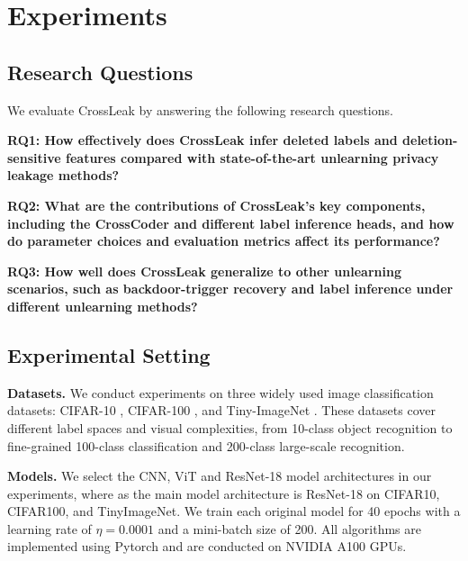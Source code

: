  



\section{Experiments} \label{exp}


\subsection{Research Questions}
\label{sec:exp_rqs}

We evaluate CrossLeak by answering the following research questions.

\textbf{RQ1: How effectively does CrossLeak infer deleted labels and deletion-sensitive features compared with state-of-the-art unlearning privacy leakage methods?}

\textbf{RQ2: What are the contributions of CrossLeak's key components, including the CrossCoder and different label inference heads, and how do parameter choices and evaluation metrics affect its performance?}

\textbf{RQ3: How well does CrossLeak generalize to other unlearning scenarios, such as backdoor-trigger recovery and label inference under different unlearning methods?}





\subsection{Experimental Setting}



\noindent
\textbf{Datasets.}
We conduct experiments on three widely used image classification datasets: CIFAR-10 \citep{krizhevsky2009learning}, CIFAR-100 \citep{krizhevsky2009learning}, and Tiny-ImageNet \citep{le2015tiny}. These datasets cover different label spaces and visual complexities, from 10-class object recognition to fine-grained 100-class classification and 200-class large-scale recognition. 



\noindent
\textbf{Models.}
We select the CNN, ViT and ResNet-18 model architectures in our experiments, where as the main model architecture is ResNet-18 on CIFAR10, CIFAR100, and TinyImageNet. We train each original model for 40 epochs with a learning rate of $\eta=0.0001$ and a mini-batch size of 200. All algorithms are implemented using Pytorch and are conducted on NVIDIA A100 GPUs. 



